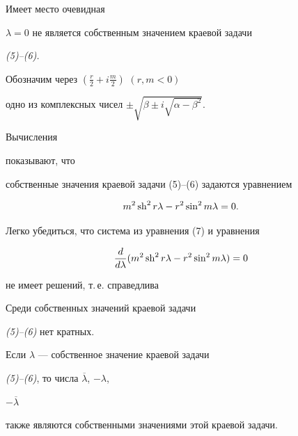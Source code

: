 Имеет место очевидная 


 


\begin{lem} $\lambda=0$ не является собственным значением краевой задачи 


{\em (5)--(6).} 


\end{lem} 


 


Обозначим через $(\frac{r}{2}+i\frac{m}{2})$ $(r,m<0)$ 


одно из комплексных чисел $\pm\sqrt{\beta\pm i\sqrt{\alpha-\beta^2}}$. 


Вычисления 


показывают, что 


собственные значения краевой задачи (5)--(6) задаются уравнением 


\begin{equation} 


m^2\sh^2r\lambda-r^2\sin^2m\lambda=0. 


\end{equation} 


 


Легко убедиться, что система из уравнения (7) и уравнения 


$$ 


\frac{d}{d\lambda}(m^2\sh^2r\lambda-r^2\sin^2m\lambda)=0 


$$ 


не имеет решений, т.\,е. справедлива


 


\begin{lem} Среди собственных значений краевой задачи 


{\em (5)--(6)} нет кратных. 


\end{lem} 


 


\begin{lem} Если $\lambda$ --- собственное значение краевой задачи 


{\em (5)--(6)}, то числа $\overline\lambda$, $-\lambda$, 


$-\overline\lambda$


также являются собственными значениями этой краевой задачи. 


\end{lem} 


